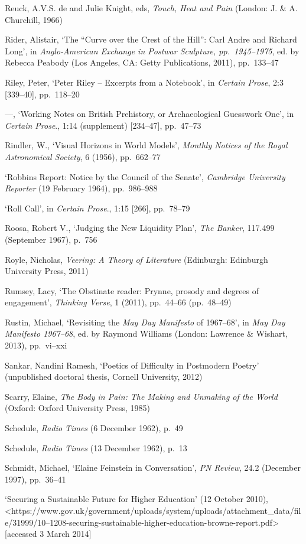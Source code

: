 \documentclass[]{article}
\begin{document}
Reuck, A.V.S. de and Julie Knight, eds, \emph{Touch, Heat and Pain}
(London: J. \& A. Churchill, 1966)

Rider, Alistair, ‘The “Curve over the Crest of the Hill”: Carl Andre and
Richard Long’, in \emph{Anglo-American Exchange in Postwar Sculpture,
pp.~1945–1975}, ed. by Rebecca Peabody (Los Angeles, CA: Getty
Publications, 2011), pp.~133–47

Riley, Peter, ‘Peter Riley – Excerpts from a Notebook’, in \emph{Certain
Prose}, 2:3 {[}339–40{]}, pp.~118–20

—, ‘Working Notes on British Prehistory, or Archaeological Guesswork
One’, in \emph{Certain Prose}., 1:14 (supplement) {[}234–47{]},
pp.~47–73

Rindler, W., ‘Visual Horizons in World Models’, \emph{Monthly Notices of
the Royal Astronomical Society}, 6 (1956), pp.~662–77

‘Robbins Report: Notice by the Council of the Senate’, \emph{Cambridge
University Reporter} (19 February 1964), pp.~986–988

‘Roll Call’, in \emph{Certain Prose}., 1:15 {[}266{]}, pp.~78–79

Roosa, Robert V., ‘Judging the New Liquidity Plan’, \emph{The Banker},
117.499 (September 1967), p.~756

Royle, Nicholas, \emph{Veering: A Theory of Literature} (Edinburgh:
Edinburgh University Press, 2011)

Rumsey, Lacy, ‘The Obstinate reader: Prynne, prosody and degrees of
engagement’, \emph{Thinking Verse}, 1 (2011), pp.~44–66 (pp.~48–49)

Rustin, Michael, ‘Revisiting the \emph{May Day Manifesto} of 1967–68’,
in \emph{May Day Manifesto 1967–68}, ed. by Raymond Williams (London:
Lawrence \& Wishart, 2013), pp.~vi–xxi

Sankar, Nandini Ramesh, ‘Poetics of Difficulty in Postmodern Poetry’
(unpublished doctoral thesis, Cornell University, 2012)

Scarry, Elaine, \emph{The Body in Pain: The Making and Unmaking of the
World} (Oxford: Oxford University Press, 1985)

Schedule, \emph{Radio Times} (6 December 1962), p.~49

Schedule, \emph{Radio Times} (13 December 1962), p.~13

Schmidt, Michael, ‘Elaine Feinstein in Conversation’, \emph{PN Review},
24.2 (December 1997), pp.~36–41

‘Securing a Sustainable Future for Higher Education’ (12 October
2010),\\
\textless{}https://www.gov.uk/government/uploads/system/uploads/attachment\_data/file/31999/10–1208-securing-sustainable-higher-education-browne-report.pdf\textgreater{}
{[}accessed 3 March 2014{]}
\end{document}
